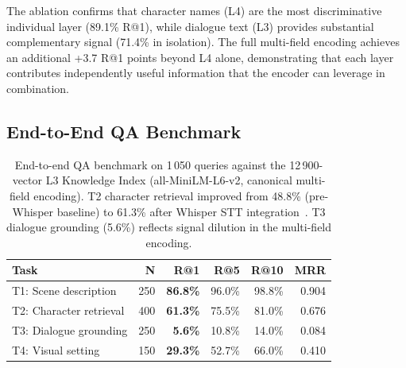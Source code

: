 \documentclass[11pt]{article}
\begin{document}
The ablation confirms that character names (L4) are the most discriminative
individual layer (89.1\% R@1), while dialogue text (L3) provides substantial
complementary signal (71.4\% in isolation).  The full multi-field encoding
achieves an additional +3.7 R@1 points beyond L4 alone, demonstrating that
each layer contributes independently useful information that the encoder can
leverage in combination.

\subsection{End-to-End QA Benchmark}

\begin{table}[!htb]
\centering
\begin{tabular}{>{\raggedright\arraybackslash}p{4.6cm} r r r r r}
\toprule
\textbf{Task} & \textbf{N} & \textbf{R@1} & \textbf{R@5} & \textbf{R@10} & \textbf{MRR} \\
\midrule
T1: Scene description  & 250 & \textbf{86.8\%} & 96.0\% & 98.8\% & 0.904 \\
T2: Character retrieval & 400 & \textbf{61.3\%} & 75.5\% & 81.0\% & 0.676 \\
T3: Dialogue grounding & 250 & \textbf{5.6\%}  & 10.8\% & 14.0\% & 0.084 \\
T4: Visual setting     & 150 & \textbf{29.3\%} & 52.7\% & 66.0\% & 0.410 \\
\bottomrule
\end{tabular}
\caption{End-to-end QA benchmark on 1\,050 queries against the 12\,900-vector
L3 Knowledge Index (all-MiniLM-L6-v2, canonical multi-field encoding).  T2
character retrieval improved from 48.8\% (pre-Whisper baseline) to 61.3\%
after Whisper STT integration~\cite{whisper}.  T3 dialogue grounding (5.6\%)
reflects signal dilution in the multi-field encoding.}
\label{tab:qa_results}
\end{table}
\end{document}
